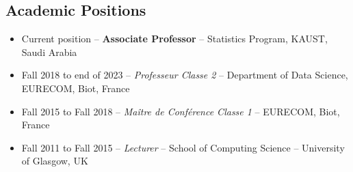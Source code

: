 \documentclass[oneside, a4paper, onecolumn, 10pt]{article}
\begin{document}
	 

\subsection*{Academic Positions}

	
                          
\begin{itemize}
\item Current position -- {\bf Associate Professor} -- %
  Statistics Program, KAUST, Saudi Arabia %

\item Fall 2018 to end of 2023 -- {\em Professeur Classe 2} -- %
  Department of Data Science, EURECOM, Biot, France %




\item Fall 2015 to Fall 2018 -- {\em Ma\^{i}tre de Conf\'{e}rence Classe 1} -- %
  EURECOM, Biot, France %

\item Fall 2011 to Fall 2015 -- {\em Lecturer} -- %
  School of Computing Science -- University of Glasgow, UK %


\end{itemize}
\end{document}
